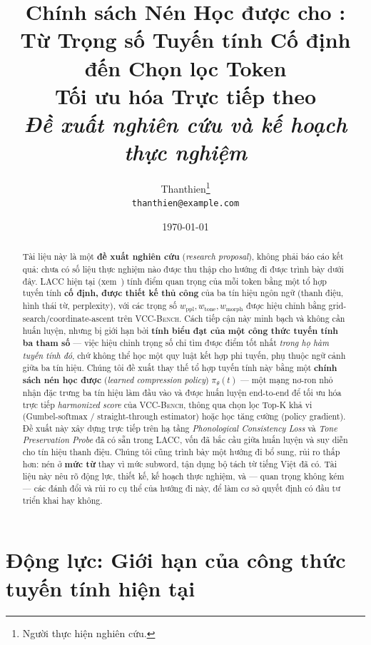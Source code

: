 \documentclass[12pt,a4paper]{article}
\title{\textbf{Chính sách Nén Học được cho \method{LACC}: \\
        Từ Trọng số Tuyến tính Cố định đến Chọn lọc Token \\
        Tối ưu hóa Trực tiếp theo \method{VCC-Bench}} \\[4pt]
        \large \textit{Đề xuất nghiên cứu và kế hoạch thực nghiệm}}
\author{
  Thanthien\thanks{Người thực hiện nghiên cứu.} \\
  \texttt{thanthien@example.com}
}
\date{\today}
\newcommand{\method}[1]{\textsc{#1}}         %
\newcommand{\pol}[1]{\pi_{\theta}(#1)}       %
\begin{document}
\maketitle

\begin{abstract}
Tài liệu này là một \textbf{đề xuất nghiên cứu} (\textit{research proposal}), không phải báo cáo kết quả: chưa có số liệu thực nghiệm nào được thu thập cho hướng đi được trình bày dưới đây. \method{LACC} hiện tại (xem~\cite{lacc2026}) tính điểm quan trọng của mỗi token bằng một tổ hợp tuyến tính \textbf{cố định, được thiết kế thủ công} của ba tín hiệu ngôn ngữ (thanh điệu, hình thái từ, perplexity), với các trọng số $w_{\text{ppl}}, w_{\text{tone}}, w_{\text{morph}}$ được hiệu chỉnh bằng grid-search/coordinate-ascent trên \method{VCC-Bench}. Cách tiếp cận này minh bạch và không cần huấn luyện, nhưng bị giới hạn bởi \textbf{tính biểu đạt của một công thức tuyến tính ba tham số} --- việc hiệu chỉnh trọng số chỉ tìm được điểm tốt nhất \emph{trong họ hàm tuyến tính đó}, chứ không thể học một quy luật kết hợp phi tuyến, phụ thuộc ngữ cảnh giữa ba tín hiệu. Chúng tôi đề xuất thay thế tổ hợp tuyến tính này bằng một \textbf{chính sách nén học được} (\textit{learned compression policy}) $\pol{t}$ --- một mạng nơ-ron nhỏ nhận đặc trưng ba tín hiệu làm đầu vào và được huấn luyện end-to-end để tối ưu hóa trực tiếp \textit{harmonized score} của \method{VCC-Bench}, thông qua chọn lọc Top-K khả vi (Gumbel-softmax / straight-through estimator) hoặc học tăng cường (policy gradient). Đề xuất này xây dựng trực tiếp trên hạ tầng \textit{Phonological Consistency Loss} và \textit{Tone Preservation Probe} đã có sẵn trong \method{LACC}, vốn đã bắc cầu giữa huấn luyện và suy diễn cho tín hiệu thanh điệu. Chúng tôi cũng trình bày một hướng đi bổ sung, rủi ro thấp hơn: nén ở \textbf{mức từ} thay vì mức subword, tận dụng bộ tách từ tiếng Việt đã có. Tài liệu này nêu rõ động lực, thiết kế, kế hoạch thực nghiệm, và --- quan trọng không kém --- các đánh đổi và rủi ro cụ thể của hướng đi này, để làm cơ sở quyết định có đầu tư triển khai hay không.
\end{abstract}


\section{Động lực: Giới hạn của công thức tuyến tính hiện tại}
\end{document}
